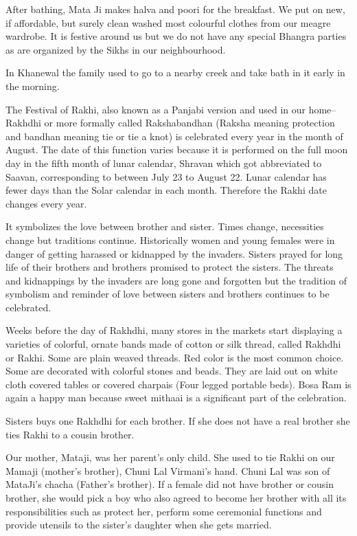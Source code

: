 After bathing, Mata Ji makes halva and poori for the breakfast. We put on
new, if affordable, but surely clean washed most colourful clothes from
our meagre wardrobe. It is festive around us but we do not have any
special Bhangra parties as are organized by the Sikhs in our
neighbourhood. 

In Khanewal the family used to go to a nearby creek and take bath in it
early in the morning. 

The Festival of Rakhi, also known as a Panjabi version and used in our
home--Rakhdhi or more formally called Rakshabandhan (Raksha meaning
protection and bandhan meaning tie or tie a knot) is celebrated every year
in the month of August. The date of this function varies because it is
performed on the full moon day in the fifth month of lunar calendar,
Shravan which got abbreviated to Saavan, corresponding to between July 23
to August 22. Lunar calendar has fewer days than the Solar calendar in
each month. Therefore the Rakhi date changes every year. 

It symbolizes the love between brother and sister. Times change,
necessities change but traditions continue. Historically women and young
females were in danger of getting harassed or kidnapped by the invaders.
Sisters prayed for long life of their brothers and brothers promised to
protect the sisters. The threats and kidnappings by the invaders are long
gone and forgotten but the tradition of symbolism and reminder of love
between sisters and brothers continues to be celebrated. 

Weeks before the day of Rakhdhi, many stores in the markets start
displaying a varieties of colorful, ornate bands made of cotton or silk
thread, called Rakhdhi or Rakhi. Some are plain weaved threads. Red color
is the most common choice. Some are decorated with colorful stones and
beads. They are laid out on white cloth covered tables or covered charpais
(Four legged portable beds).  Bosa Ram is again a happy man because sweet
mithaai is a significant part of the celebration. 

Sisters buys one Rakhdhi for each brother. If she does not have a real
brother she ties Rakhi to a cousin brother. 

Our mother, Mataji, was her parent's only child. She used to tie Rakhi on
our Mamaji (mother's brother), Chuni Lal Virmani’s hand. Chuni Lal was son
of MataJi's chacha (Father's brother). If a female did not have brother or
cousin brother, she would pick a boy who also agreed to become her brother
with all its responsibilities such as protect her, perform some ceremonial
functions and provide utensils to the sister's daughter when she gets
married. 

